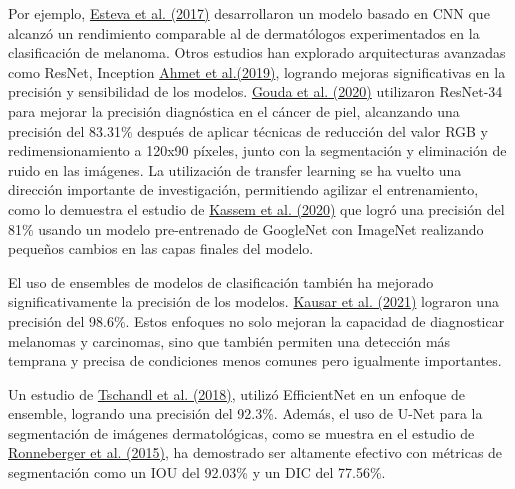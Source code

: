 \documentclass[12pt]{article}
\begin{document}
Por ejemplo, \href{https://www.nature.com/articles/nature21056}{Esteva et al. (2017)} desarrollaron un modelo basado en CNN que alcanzó 
un rendimiento comparable al de dermatólogos experimentados en la clasificación de melanoma. Otros estudios han explorado arquitecturas avanzadas 
como ResNet, Inception \href{https://www.semanticscholar.org/paper/Early-detection-of-skin-cancer-using-deep-learning-Demir-Yilmaz/aaca1d1b8708e7a1374d7effe456c96f964c5433}{Ahmet et al.(2019)}, 
logrando mejoras significativas en la precisión y sensibilidad de los modelos. \href{https://www.semanticscholar.org/paper/Skin-Cancer-Classification-using-ResNet-Gouda-Amudha/9f69195d3701818cca0ff1f9f3c1580c501fd3af}{Gouda et al. (2020)} 
utilizaron ResNet-34 para mejorar la precisión diagnóstica en el cáncer de piel, alcanzando una precisión del 83.31\% después de aplicar técnicas de 
reducción del valor RGB y redimensionamiento a 120x90 píxeles, junto con la segmentación y eliminación de ruido en las imágenes. 
La utilización de transfer learning se ha vuelto una dirección importante de investigación, permitiendo agilizar el entrenamiento,
como lo demuestra el estudio de \href{https://www.semanticscholar.org/paper/Skin-Lesions-Classification-Into-Eight-Classes-for-Kassem-Hosny/d93c65722d2e43ea9bc4e0ccd70d9357985fc145}{Kassem et al. (2020)} que logró una precisión del 
81\% usando un modelo pre-entrenado de GoogleNet con ImageNet realizando pequeños cambios en las capas finales del modelo.

El uso de ensembles de modelos de clasificación también ha mejorado significativamente la precisión de los modelos. \href{https://www.mdpi.com/2076-3417/11/22/10593}{Kausar et al. (2021)} lograron una precisión del 
98.6\%. Estos enfoques no solo mejoran la capacidad de diagnosticar 
melanomas y carcinomas, sino que también permiten una detección más temprana y precisa de condiciones menos comunes pero igualmente importantes.

Un estudio de \href{https://pubmed.ncbi.nlm.nih.gov/30106392/}{Tschandl et al. (2018)}, utilizó EfficientNet en un enfoque de ensemble, logrando una precisión del 92.3\%. Además, el uso de U-Net para la segmentación de imágenes dermatológicas, como se muestra 
en el estudio de \href{https://www.semanticscholar.org/paper/U-Net%3A-Convolutional-Networks-for-Biomedical-Image-Ronneberger-Fischer/6364fdaa0a0eccd823a779fcdd489173f938e91a}{Ronneberger et al. (2015)}, ha demostrado ser altamente efectivo con métricas de segmentación como un IOU del 92.03\% y un 
DIC del 77.56\%.
\end{document}
